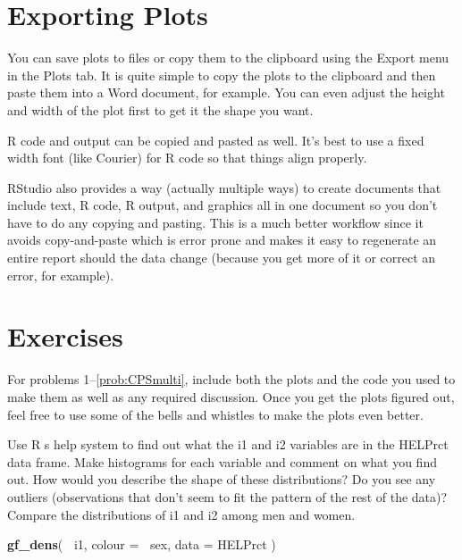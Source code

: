 \documentclass[]{book}
\newenvironment{Shaded}{\begin{snugshade}}{\end{snugshade}}
\newcommand{\DataTypeTok}[1]{\textcolor[rgb]{0.13,0.29,0.53}{#1}}
\newcommand{\KeywordTok}[1]{\textcolor[rgb]{0.13,0.29,0.53}{\textbf{#1}}}
\newcommand{\NormalTok}[1]{#1}
\newcommand{\OperatorTok}[1]{\textcolor[rgb]{0.81,0.36,0.00}{\textbf{#1}}}
\begin{document}
\hypertarget{exporting-plots}{%
\section{Exporting Plots}\label{exporting-plots}}

You can save plots to files or copy them to the clipboard using the
{ Export } menu in the { Plots } tab. It is quite simple to copy the
plots to the clipboard and then paste them into a Word document, for example.
You can even adjust the height and width of the plot first to get it the
shape you want.

R code and output can be copied and pasted as well. It's best to use a
fixed width font (like Courier) for R code so that things align properly.

RStudio also provides a way (actually multiple ways) to create documents
that include text, R code, R output, and graphics all in one document so you don't
have to do any copying and pasting. This is a much better workflow since it avoids
copy-and-paste which is error prone and makes it easy to regenerate an entire report
should the data change (because you get more of it or correct an error, for example).

\newpage

\hypertarget{exercises}{%
\section{Exercises}\label{exercises}}

For problems 1--\ref{prob:CPSmulti},
include both the plots and the code you used to make them as well as any
required discussion. Once you get the plots figured out, feel free to
use some of the bells and whistles to make the plots even better.

Use R s help system to find out what the {i1} and {i2}
variables are in the {HELPrct} data frame. Make histograms
for each variable and comment on what you find out. How would you describe
the shape of these distributions? Do you see any outliers (observations
that don't seem to fit the pattern of the rest of the data)?\\

Compare the distributions of {i1} and {i2} among men
and women.

\begin{Shaded}
\begin{Highlighting}[]
\KeywordTok{gf_dens}\NormalTok{( }\OperatorTok{~}\NormalTok{i1, }\DataTypeTok{colour =} \OperatorTok{~}\NormalTok{sex, }\DataTypeTok{data =}\NormalTok{ HELPrct )}
\end{Highlighting}
\end{Shaded}
\end{document}
